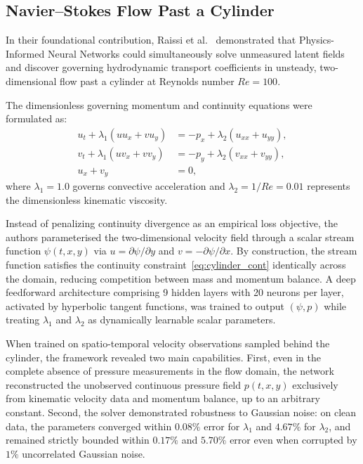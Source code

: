 \subsection{Navier--Stokes Flow Past a Cylinder}
\label{subsec:cylinder_benchmark}

In their foundational contribution, Raissi et al.\ \cite{raissi2019physics}
demonstrated that Physics-Informed Neural Networks could simultaneously solve
unmeasured latent fields and discover governing hydrodynamic transport coefficients
in unsteady, two-dimensional flow past a cylinder at Reynolds number $Re = 100$.

The dimensionless governing momentum and continuity equations were formulated as:
\begin{align}
    u_t + \lambda_1 (u u_x + v u_y) &= -p_x + \lambda_2 (u_{xx} + u_{yy}) , \label{eq:cylinder_ns_u} \\
    v_t + \lambda_1 (u v_x + v v_y) &= -p_y + \lambda_2 (v_{xx} + v_{yy}) , \label{eq:cylinder_ns_v} \\
    u_x + v_y &= 0 , \label{eq:cylinder_cont}
\end{align}
where $\lambda_1 = 1.0$ governs convective acceleration and $\lambda_2 =
1/Re = 0.01$ represents the dimensionless kinematic viscosity.

Instead of penalizing continuity divergence as an empirical loss objective, the
authors parameterised the two-dimensional velocity field through a scalar stream
function $\psi(t, x, y)$ via $u = \partial \psi / \partial y$ and $v = -\partial
\psi / \partial x$. By construction, the stream function satisfies the continuity constraint~\eqref{eq:cylinder_cont} 
identically across the domain, reducing competition between mass and momentum balance. A deep
feedforward architecture comprising 9 hidden layers with 20 neurons per layer,
activated by hyperbolic tangent functions, was trained to output $(\psi, p)$ while
treating $\lambda_1$ and $\lambda_2$ as dynamically learnable scalar parameters.

When trained on spatio-temporal velocity observations sampled behind the cylinder,
the framework revealed two main capabilities. First, even in the
complete absence of pressure measurements in the flow domain, the network
reconstructed the unobserved continuous pressure field $p(t, x, y)$ exclusively
from kinematic velocity data and momentum balance, up to an arbitrary constant.
Second, the solver demonstrated robustness to Gaussian noise:
on clean data, the parameters converged within $0.08\%$ error for $\lambda_1$ and $4.67\%$ for $\lambda_2$, and remained strictly bounded
within $0.17\%$ and $5.70\%$ error even when corrupted by $1\%$ uncorrelated
Gaussian noise.

